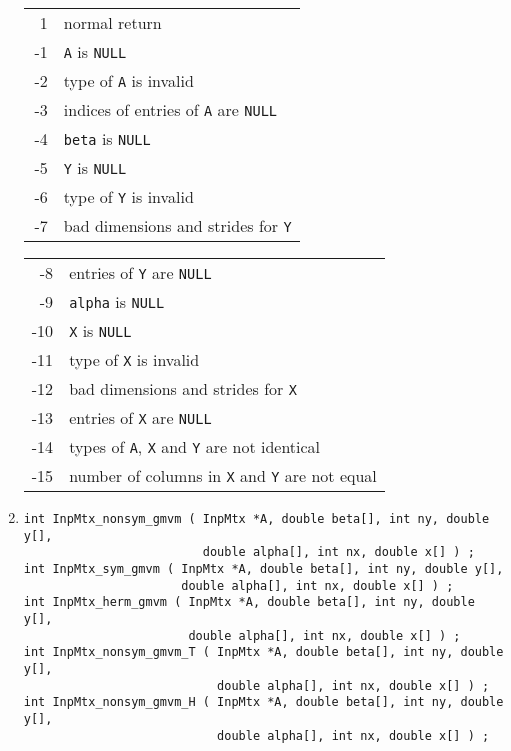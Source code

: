 \begin{enumerate}
\begin{center}
\begin{tabular}[t]{rl}
~1 & normal return \\
-1 & {\tt A} is {\tt NULL} \\
-2 & type of {\tt A} is invalid \\
-3 & indices of entries of {\tt A} are {\tt NULL} \\
-4 & {\tt beta} is {\tt NULL} \\
-5 & {\tt Y} is {\tt NULL} \\
-6 & type of {\tt Y} is invalid \\
-7 & bad dimensions and strides for {\tt Y} \\
\end{tabular}
\begin{tabular}[t]{rl}
~-8 & entries of {\tt Y} are {\tt NULL} \\
~-9 & {\tt alpha} is {\tt NULL} \\
-10 & {\tt X} is {\tt NULL} \\
-11 & type of {\tt X} is invalid \\
-12 & bad dimensions and strides for {\tt X} \\
-13 & entries of {\tt X} are {\tt NULL} \\
-14 & types of {\tt A}, {\tt X} and {\tt Y} are not identical \\
-15 & number of columns in {\tt X} and {\tt Y} are not equal
\end{tabular}
\end{center}
\item
\begin{verbatim}
int InpMtx_nonsym_gmvm ( InpMtx *A, double beta[], int ny, double y[],
                         double alpha[], int nx, double x[] ) ;
int InpMtx_sym_gmvm ( InpMtx *A, double beta[], int ny, double y[],
                      double alpha[], int nx, double x[] ) ;
int InpMtx_herm_gmvm ( InpMtx *A, double beta[], int ny, double y[],
                       double alpha[], int nx, double x[] ) ;
int InpMtx_nonsym_gmvm_T ( InpMtx *A, double beta[], int ny, double y[],
                           double alpha[], int nx, double x[] ) ;
int InpMtx_nonsym_gmvm_H ( InpMtx *A, double beta[], int ny, double y[],
                           double alpha[], int nx, double x[] ) ;
\end{verbatim}

\end{enumerate}
